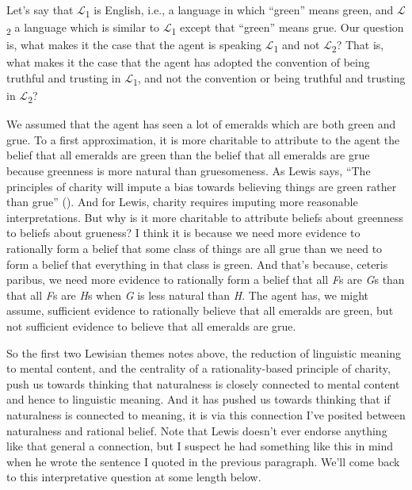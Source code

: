 \documentclass[
  11pt,
  letterpaper,
  DIV=11,
  numbers=noendperiod,
  twoside]{scrartcl}
\begin{document}
Let's say that \(\mathcal{L}\)\textsubscript{1} is English, i.e., a
language in which ``green'' means green, and
\(\mathcal{L}\)\textsubscript{2} a language which is similar to
\(\mathcal{L}\)\textsubscript{1} except that ``green'' means grue. Our
question is, what makes it the case that the agent is speaking
\(\mathcal{L}\)\textsubscript{1} and not
\(\mathcal{L}\)\textsubscript{2}? That is, what makes it the case that
the agent has adopted the convention of being truthful and trusting in
\(\mathcal{L}\)\textsubscript{1}, and not the convention or being
truthful and trusting in \(\mathcal{L}\)\textsubscript{2}?

We assumed that the agent has seen a lot of emeralds which are both
green and grue. To a first approximation, it is more charitable to
attribute to the agent the belief that all emeralds are green than the
belief that all emeralds are grue because greenness is more natural than
gruesomeness. As Lewis says, ``The principles of charity will impute a
bias towards believing things are green rather than grue''
(). And for Lewis, charity requires
imputing more reasonable interpretations. But why is it more charitable
to attribute beliefs about greenness to beliefs about grueness? I think
it is because we need more evidence to rationally form a belief that
some class of things are all grue than we need to form a belief that
everything in that class is green. And that's because, ceteris paribus,
we need more evidence to rationally form a belief that all \emph{F}s are
\emph{G}s than that all \emph{F}s are \emph{H}s when \emph{G} is less
natural than \emph{H}. The agent has, we might assume, sufficient
evidence to rationally believe that all emeralds are green, but not
sufficient evidence to believe that all emeralds are grue.

So the first two Lewisian themes notes above, the reduction of
linguistic meaning to mental content, and the centrality of a
rationality-based principle of charity, push us towards thinking that
naturalness is closely connected to mental content and hence to
linguistic meaning. And it has pushed us towards thinking that if
naturalness is connected to meaning, it is via this connection I've
posited between naturalness and rational belief. Note that Lewis doesn't
ever endorse anything like that general a connection, but I suspect he
had something like this in mind when he wrote the sentence I quoted in
the previous paragraph. We'll come back to this interpretative question
at some length below.
\end{document}
